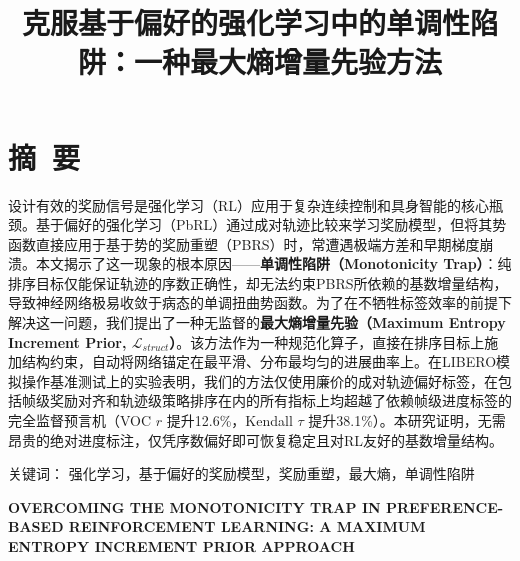 

\renewcommand{\mytitle}{克服基于偏好的强化学习中的单调性陷阱：一种最大熵增量先验方法}
\renewcommand{\mytitleEN}{OVERCOMING THE MONOTONICITY TRAP IN PREFERENCE-BASED REINFORCEMENT LEARNING: A MAXIMUM ENTROPY INCREMENT PRIOR APPROACH}


\setlength{\baselineskip}{20pt}

\title{\hei{}\bfseries\mytitle}
\maketitle
\thispagestyle{empty}
\clearpage



{\pagestyle{plain}
\tableofcontents
\clearpage}


\section*{摘~要}
设计有效的奖励信号是强化学习（RL）应用于复杂连续控制和具身智能的核心瓶颈。基于偏好的强化学习（PbRL）通过成对轨迹比较来学习奖励模型，但将其势函数直接应用于基于势的奖励重塑（PBRS）时，常遭遇极端方差和早期梯度崩溃。本文揭示了这一现象的根本原因——\textbf{单调性陷阱（Monotonicity Trap）}：纯排序目标仅能保证轨迹的序数正确性，却无法约束PBRS所依赖的基数增量结构，导致神经网络极易收敛于病态的单调扭曲势函数。为了在不牺牲标签效率的前提下解决这一问题，我们提出了一种无监督的\textbf{最大熵增量先验（Maximum Entropy Increment Prior, $\mathcal{L}_{struct}$）}。该方法作为一种规范化算子，直接在排序目标上施加结构约束，自动将网络锚定在最平滑、分布最均匀的进展曲率上。在LIBERO模拟操作基准测试上的实验表明，我们的方法仅使用廉价的成对轨迹偏好标签，在包括帧级奖励对齐和轨迹级策略排序在内的所有指标上均超越了依赖帧级进度标签的完全监督预言机（VOC $r$ 提升12.6\%，Kendall $\tau$ 提升38.1\%）。本研究证明，无需昂贵的绝对进度标注，仅凭序数偏好即可恢复稳定且对RL友好的基数增量结构。

\vspace{1em}\noindent
{\hei 关键词：}
{\song 强化学习，基于偏好的奖励模型，奖励重塑，最大熵，单调性陷阱}
\clearpage



{\centering{}\bfseries\sffamily \mytitleEN\par}
\vspace{1em}

